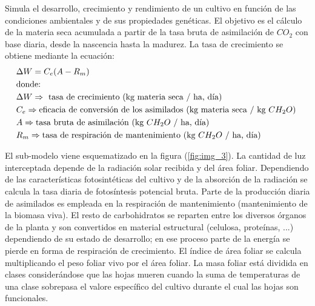 Simula el desarrollo, crecimiento y rendimiento de un cultivo en función de las condiciones ambientales y de sus propiedades genéticas. El objetivo es el cálculo de la materia seca acumulada a partir de la tasa bruta de asimilación de $ CO_2 $ con base diaria, desde la nascencia hasta la madurez. La tasa de crecimiento se obtiene mediante la ecuación:
\begin{align*}
	&\Delta W = C_e(A-R_m) \\
	&\text{donde: } \\
	&\Delta W \Rightarrow \text{ tasa de crecimiento (kg materia seca / ha, día)} \\
	&C_e  \Rightarrow \text{eficacia de conversión de los asimilados (kg materia seca / kg $ CH_2O $) } \\
	&A \Rightarrow \text{tasa bruta de asimilación (kg $ CH_2O $ / ha, día)} \\
	&R_m \Rightarrow \text{tasa de respiración de mantenimiento  (kg $ CH_2O $ / ha, día)}
\end{align*}

El sub-modelo viene esquematizado en la figura (\ref{fig:img_3}). La cantidad de luz interceptada depende de la radiación solar recibida y del área foliar. Dependiendo de las características fotosintéticas del cultivo y de la absorción de la radiación se calcula la tasa diaria de fotosíntesis potencial bruta. Parte de la producción diaria de asimilados es empleada en la respiración de mantenimiento (mantenimiento de la biomasa viva). El resto de carbohidratos se reparten entre los diversos órganos de la planta y son convertidos en material estructural (celulosa, proteínas, ...) dependiendo de su estado de desarrollo; en ese proceso parte de la energía se pierde en forma de respiración de crecimiento. El índice de área foliar se calcula multiplicando el peso foliar vivo por el área foliar. La masa foliar está dividida en clases considerándose que las hojas mueren cuando la suma de temperaturas de una clase sobrepasa el valore específico del cultivo durante el cual las hojas son funcionales.

